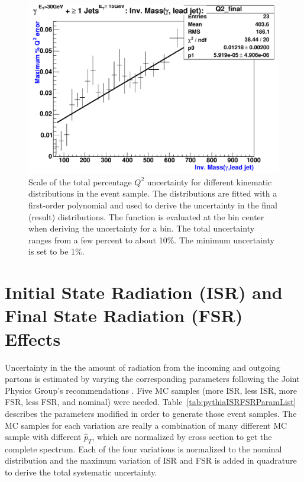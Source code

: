 \begin{figure}[p]
 \includegraphics[scale=0.36,keepaspectratio=true]{Q2syst_pj1_InvM_phojet.pdf}
 \caption{Scale of the total percentage $Q^{2}$ uncertainty for different kinematic distributions in the \phoonejet event sample. The distributions are fitted with a first-order polynomial and used to derive the uncertainty in the final (result) distributions. The function is evaluated at the bin center when deriving the uncertainty for a bin. The total uncertainty ranges from a few percent to about 10\%. The minimum uncertainty is set to be 1\%.}
 \label{fig:Q2Syst}
\end{figure}

\section{Initial State Radiation (ISR) and Final State Radiation (FSR) Effects}
Uncertainty in the the amount of radiation from the incoming and outgoing partons is estimated by varying the corresponding \pythiaText parameters following the Joint Physics Group's recommendations \cite{www:JPforISRFSRsyst}. Five MC samples (more ISR, less ISR, more FSR, less FSR, and nominal) were needed. Table~\ref{tab:pythiaISRFSRParamList} describes the \pythiaText parameters modified in order to generate those event samples. The MC samples for each variation are really a combination of many different MC sample with different $\hat{p}_{T}$, which are normalized by cross section to get the complete spectrum. Each of the four variations is normalized to the nominal distribution and the maximum variation of ISR and FSR is added in quadrature to derive the total systematic uncertainty.

